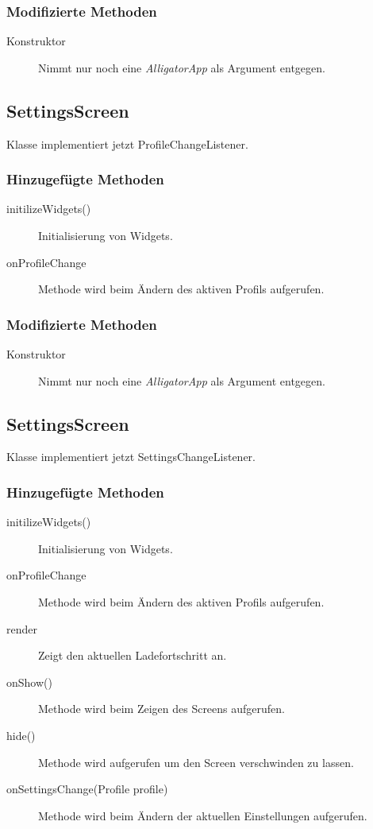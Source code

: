 \subsubsection{Modifizierte Methoden}
\begin{description}
\item[Konstruktor]
Nimmt nur noch eine \emph{AlligatorApp} als Argument entgegen.

\end{description}


\subsection{SettingsScreen}
Klasse implementiert jetzt ProfileChangeListener.
\subsubsection{Hinzugefügte Methoden}
\begin{description}
\item[initilizeWidgets()]
Initialisierung von Widgets.
\item[onProfileChange]
Methode wird beim Ändern des aktiven Profils aufgerufen.

\end{description}

\subsubsection{Modifizierte Methoden}
\begin{description}
\item[Konstruktor]
Nimmt nur noch eine \emph{AlligatorApp} als Argument entgegen.

\end{description}


\subsection{SettingsScreen}
Klasse implementiert jetzt SettingsChangeListener.
\subsubsection{Hinzugefügte Methoden}
\begin{description}
\item[initilizeWidgets()]
Initialisierung von Widgets.
\item[onProfileChange]
Methode wird beim Ändern des aktiven Profils aufgerufen.
\item[render]
Zeigt den aktuellen Ladefortschritt an.
\item[onShow()]
Methode wird beim Zeigen des Screens aufgerufen.
\item[hide()]
Methode wird aufgerufen um den Screen verschwinden zu lassen.
\item[onSettingsChange(Profile profile)]
Methode wird beim Ändern der aktuellen Einstellungen aufgerufen.

\end{description}


